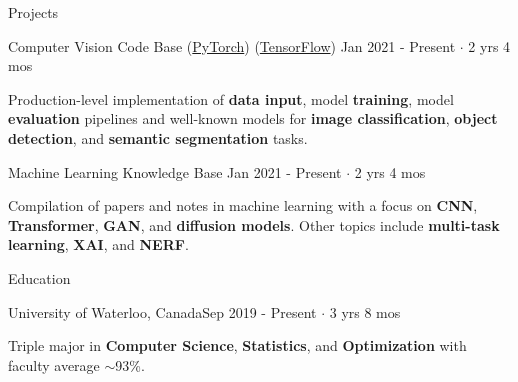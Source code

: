 \documentclass{resume}
\begin{document}
\begin{rSection}{Projects}


    \begin{rSubsection}{Computer Vision Code Base
            (\href{https://github.com/danielmao2019/Computer-Vision-PyTorch}{\faGithub PyTorch})
            (\href{https://github.com/danielmao2019/Computer-Vision-TensorFlow}{\faGithub TensorFlow})
        }{Jan 2021 - Present \(\cdot\) 2 yrs 4 mos}{}{}
        \item Production-level implementation of \textbf{data input}, model \textbf{training}, model \textbf{evaluation} pipelines and well-known models for \textbf{image classification}, \textbf{object detection}, and \textbf{semantic segmentation} tasks.
    \end{rSubsection}
    \begin{rSubsection}{Machine Learning Knowledge Base
            \href{https://github.com/danielmao2019/Machine-Learning-Knowledge-Base}{\faGithub}
        }{Jan 2021 - Present \(\cdot\) 2 yrs 4 mos}{}{}
        \item Compilation of papers and notes in machine learning with a focus on \textbf{CNN}, \textbf{Transformer}, \textbf{GAN}, and \textbf{diffusion models}. Other topics include \textbf{multi-task learning}, \textbf{XAI}, and \textbf{NERF}.
    \end{rSubsection}

\end{rSection}

\begin{rSection}{Education}

    \begin{rSubsection}{University of Waterloo, Canada}{Sep 2019 - Present \(\cdot\) 3 yrs 8 mos}{}{}
        \item Triple major in \textbf{Computer Science}, \textbf{Statistics}, and \textbf{Optimization} with faculty average \(\sim\)93\%.
    \end{rSubsection}

\end{rSection}
\end{document}
